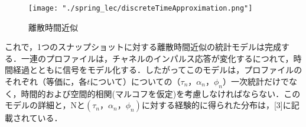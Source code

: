 \documentclass[dvipdfmx]{jsarticle}
\begin{document}
\begin{figure}[H]
\begin{center}
\texttt{[image: "./spring\_lec/discreteTimeApproximation.png"]}
\end{center}
\caption{離散時間近似}
\end{figure}

これで，1つのスナップショットに対する離散時間近似の統計モデルは完成する．一連のプロファイルは，チャネルのインパルス応答が変化するにつれて，時間経過とともに信号をモデル化する．したがってこのモデルは，プロファイルのそれぞれ（等価に，各$t$について）についての$（\tau_n，\alpha_n，\phi_n）$一次統計だけでなく，時間的および空間的相関(マルコフを仮定)を考慮しなければならない．このモデルの詳細と，Nと$(\tau_n， \alpha_n， \phi_n)$に対する経験的に得られた分布は，[3]に記載されている．
\end{document}
